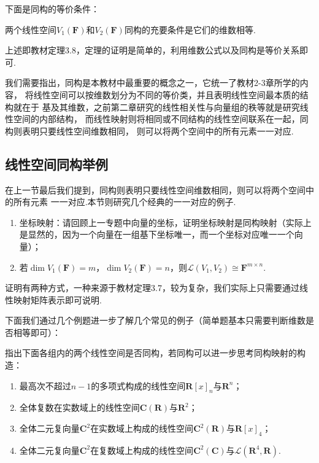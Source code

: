 下面是同构的等价条件：
\begin{theorem}
    两个线性空间$V_1(\mathbf{F})$和$V_2(\mathbf{F})$同构的充要条件是它们的维数相等.
\end{theorem}
上述即教材定理3.8，定理的证明是简单的，利用维数公式以及同构是等价关系即可.

我们需要指出，同构是本教材中最重要的概念之一，它统一了教材2-3章所学的内容，
将线性空间可以按维数划分为不同的等价类，并且表明线性空间最本质的结构就在于
基及其维数，之前第二章研究的线性相关性与向量组的秩等就是研究线性空间的内部结构，
而线性映射则将相同或不同结构的线性空间联系在一起，同构则表明只要线性空间维数相同，
则可以将两个空间中的所有元素一一对应.
\subsection{线性空间同构举例}
在上一节最后我们提到，同构则表明只要线性空间维数相同，则可以将两个空间中的所有元素
一一对应.本节则研究几个经典的一一对应的例子.
\begin{enumerate}
    \item 坐标映射：请回顾上一专题中向量的坐标，证明坐标映射是同构映射（实际上是显然的，因为一个向量在一组基下坐标唯一，而一个坐标对应唯一一个向量）；

    \item 若$\dim V_1(\mathbf{F})=m$，$\dim V_2(\mathbf{F})=n$，则$\mathcal{L}(V_1,V_2) \cong \mathbf{F}^{m \times n}$.
\end{enumerate}

证明有两种方式，一种来源于教材定理3.7，较为复杂，我们实际上只需要通过线性映射矩阵表示即可说明.

下面我们通过几个例题进一步了解几个常见的例子（简单题基本只需要判断维数是否相等即可）：
\begin{example}
    指出下面各组内的两个线性空间是否同构，若同构可以进一步思考同构映射的构造：
    \begin{enumerate}
        \item 最高次不超过$n-1$的多项式构成的线性空间$\mathbf{R}[x]_n$与$\mathbf{R}^n$；

        \item 全体复数在实数域上的线性空间$\mathbf{C}(\mathbf{R})$与$\mathbf{R}^2$；

        \item 全体二元复向量$\mathbf{C}^2$在实数域上构成的线性空间$\mathbf{C}^2(\mathbf{R})$与$\mathbf{R}[x]_4$；

        \item 全体二元复向量$\mathbf{C}^2$在复数域上构成的线性空间$\mathbf{C}^2(\mathbf{C})$与$\mathcal{L}(\mathbf{R}^4,\mathbf{R})$.
    \end{enumerate}
\end{example}

